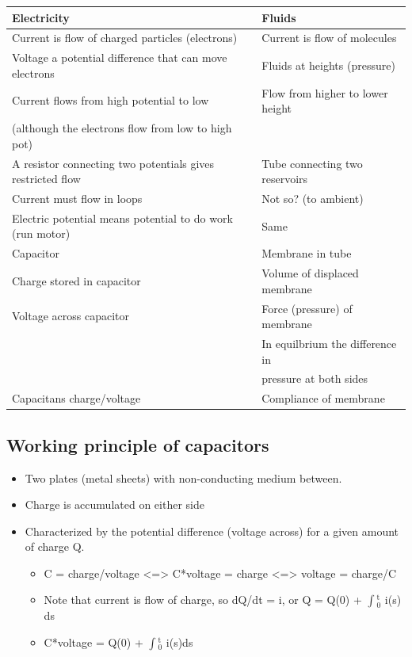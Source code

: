 \documentclass[a4paper]{scrartcl}
\begin{document}
\begin{center}
\begin{tabular}{ll}
Electricity & Fluids\\
\hline
Current is flow of charged particles (electrons) & Current is flow of molecules\\
Voltage a potential difference that can move electrons & Fluids at  heights (pressure)\\
Current flows from high potential to low & Flow from higher to lower height\\
(although the electrons flow from low to high pot) & \\
A resistor connecting two potentials gives restricted flow & Tube connecting two reservoirs\\
Current must flow in loops & Not so? (to ambient)\\
Electric potential means potential to do work (run motor) & Same\\
Capacitor & Membrane in tube\\
Charge stored in capacitor & Volume of displaced membrane\\
Voltage across capacitor & Force (pressure) of membrane\\
 & In equilbrium the difference in\\
 & pressure at both sides\\
Capacitans charge/voltage & Compliance of membrane\\
\end{tabular}
\end{center}

\subsection{Working principle of capacitors}
\label{sec-2-2}
\begin{itemize}
\item Two plates (metal sheets) with non-conducting medium between.
\item Charge is accumulated on either side
\item Characterized by the potential difference (voltage across) for a given amount of charge Q.
\begin{itemize}
\item C = charge/voltage <=> C*voltage = charge <=> voltage = charge/C
\item Note that current is flow of charge, so dQ/dt = i, or Q = Q(0) + $\int$$_{\text{0}}^{\text{t}}$ i(s) ds
\item C*voltage = Q(0) + $\int$$_{\text{0}}^{\text{t}}$ i(s)ds
\end{itemize}
\end{itemize}
\end{document}
